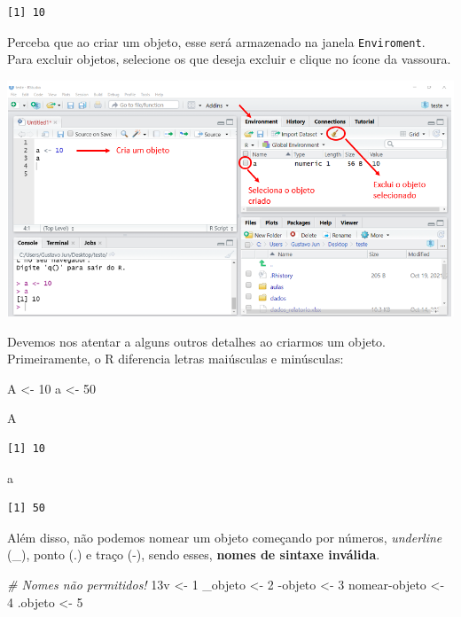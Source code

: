 \documentclass[
  brazilian,
]{book}
\newenvironment{Shaded}{\begin{snugshade}}{\end{snugshade}}
\newcommand{\CommentTok}[1]{\textcolor[rgb]{0.56,0.35,0.01}{\textit{#1}}}
\newcommand{\DecValTok}[1]{\textcolor[rgb]{0.00,0.00,0.81}{#1}}
\newcommand{\NormalTok}[1]{#1}
\newcommand{\OtherTok}[1]{\textcolor[rgb]{0.56,0.35,0.01}{#1}}
\newcommand{\SpecialCharTok}[1]{\textcolor[rgb]{0.00,0.00,0.00}{#1}}
\begin{document}
\begin{verbatim}
[1] 10
\end{verbatim}

Perceba que ao criar um objeto, esse será armazenado na janela \texttt{Enviroment}. Para excluir objetos, selecione os que deseja excluir e clique no ícone da vassoura.

\begin{center}\includegraphics[width=0.8\linewidth]{imagens/objeto} \end{center}

Devemos nos atentar a alguns outros detalhes ao criarmos um objeto. Primeiramente, o R diferencia letras maiúsculas e minúsculas:

\begin{Shaded}
\begin{Highlighting}[]
\NormalTok{A }\OtherTok{\textless{}{-}} \DecValTok{10}
\NormalTok{a }\OtherTok{\textless{}{-}} \DecValTok{50}

\NormalTok{A}
\end{Highlighting}
\end{Shaded}

\begin{verbatim}
[1] 10
\end{verbatim}

\begin{Shaded}
\begin{Highlighting}[]
\NormalTok{a}
\end{Highlighting}
\end{Shaded}

\begin{verbatim}
[1] 50
\end{verbatim}

Além disso, não podemos nomear um objeto começando por números, \emph{underline} (\_), ponto (.) e traço (-), sendo esses, \textbf{nomes de sintaxe inválida}.

\begin{Shaded}
\begin{Highlighting}[]
\CommentTok{\# Nomes não permitidos!}
\NormalTok{13v }\OtherTok{\textless{}{-}} \DecValTok{1}
\NormalTok{\_objeto }\OtherTok{\textless{}{-}} \DecValTok{2}
\SpecialCharTok{{-}}\NormalTok{objeto }\OtherTok{\textless{}{-}} \DecValTok{3}
\NormalTok{nomear}\SpecialCharTok{{-}}\NormalTok{objeto }\OtherTok{\textless{}{-}} \DecValTok{4}
\NormalTok{.objeto }\OtherTok{\textless{}{-}} \DecValTok{5}
\end{Highlighting}
\end{Shaded}
\end{document}
